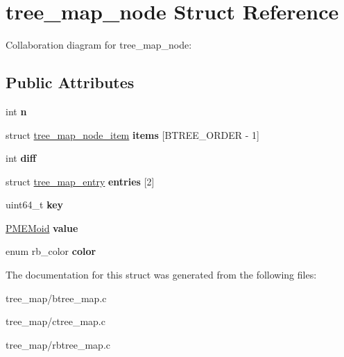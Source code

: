 \hypertarget{structtree__map__node}{}\section{tree\+\_\+map\+\_\+node Struct Reference}
\label{structtree__map__node}


Collaboration diagram for tree\+\_\+map\+\_\+node\+:
\subsection*{Public Attributes}
\begin{DoxyCompactItemize}
\item 
\mbox{\label{structtree__map__node_ac5700d2fb4f127fd12ee943a5b1b3e69}} 
int {\bfseries n}
\item 
\mbox{\label{structtree__map__node_a51424ed9e6cb341fb52cb864e1ab1011}} 
struct \hyperlink{structtree__map__node__item}{tree\+\_\+map\+\_\+node\+\_\+item} {\bfseries items} \mbox{[}B\+T\+R\+E\+E\+\_\+\+O\+R\+D\+ER -\/ 1\mbox{]}
\item 
\mbox{\label{structtree__map__node_a3a9f2fdad02994a8128045ac913ac773}} 
int {\bfseries diff}
\item 
\mbox{\label{structtree__map__node_abae1a5c008bcad6d9d04a8d436c411f2}} 
struct \hyperlink{structtree__map__entry}{tree\+\_\+map\+\_\+entry} {\bfseries entries} \mbox{[}2\mbox{]}
\item 
\mbox{\label{structtree__map__node_a50dfdded70535cc89f633ca4872e13d0}} 
uint64\+\_\+t {\bfseries key}
\item 
\mbox{\label{structtree__map__node_af9dd8ed1e4d9a3c2f7d388c279d89371}} 
\hyperlink{structpmemoid}{P\+M\+E\+Moid} {\bfseries value}
\item 
\mbox{\label{structtree__map__node_a6807cf831fd3c8f5fe229200ac32b09a}} 
enum rb\+\_\+color {\bfseries color}
\end{DoxyCompactItemize}


The documentation for this struct was generated from the following files\+:\begin{DoxyCompactItemize}
\item 
tree\+\_\+map/btree\+\_\+map.\+c\item 
tree\+\_\+map/ctree\+\_\+map.\+c\item 
tree\+\_\+map/rbtree\+\_\+map.\+c\end{DoxyCompactItemize}
